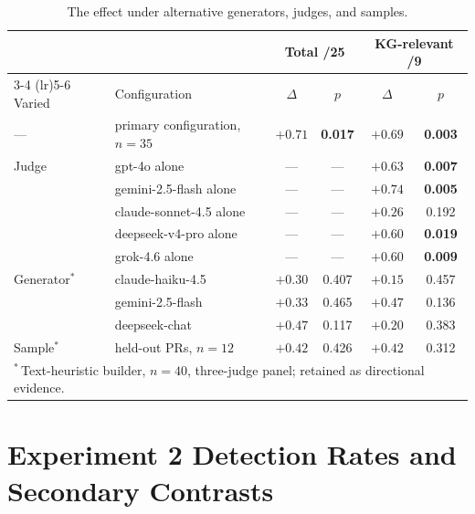 \begin{table}[htbp]
    \centering
    \caption{The \kg{} effect under alternative generators, judges,
             and samples.}
    \label{tab:exp1-robustness}
    \small
    \setlength{\tabcolsep}{5pt}
    \begin{tabular}{llcccc}
        \toprule
        & & \multicolumn{2}{c}{Total /25} & \multicolumn{2}{c}{KG-relevant /9} \\
        \cmidrule(lr){3-4} \cmidrule(lr){5-6}
        Varied & Configuration & $\Delta$ & $p$ & $\Delta$ & $p$ \\
        \midrule
        ---       & primary configuration, $n = 35$ & $+0.71$ & \textbf{0.017} & $+0.69$ & \textbf{0.003} \\
        \midrule
        Judge     & gpt-4o alone             & --- & --- & $+0.63$ & \textbf{0.007} \\
                  & gemini-2.5-flash alone   & --- & --- & $+0.74$ & \textbf{0.005} \\
                  & claude-sonnet-4.5 alone  & --- & --- & $+0.26$ & 0.192 \\
                  & deepseek-v4-pro alone    & --- & --- & $+0.60$ & \textbf{0.019} \\
                  & grok-4.6 alone           & --- & --- & $+0.60$ & \textbf{0.009} \\
        \midrule
        Generator$^{*}$ & claude-haiku-4.5    & $+0.30$ & 0.407 & $+0.15$ & 0.457 \\
                  & gemini-2.5-flash         & $+0.33$ & 0.465 & $+0.47$ & 0.136 \\
                  & deepseek-chat            & $+0.47$ & 0.117 & $+0.20$ & 0.383 \\
        \midrule
        Sample$^{*}$ & held-out PRs, $n = 12$   & $+0.42$ & 0.426 & $+0.42$ & 0.312 \\
        \bottomrule
        \multicolumn{6}{l}{\footnotesize $^{*}$\,Text-heuristic builder, $n = 40$, three-judge panel; retained as directional evidence.} \\
    \end{tabular}
\end{table}

\section{Experiment 2 Detection Rates and Secondary Contrasts}
\label{app:supporting-exp2-contrasts}

